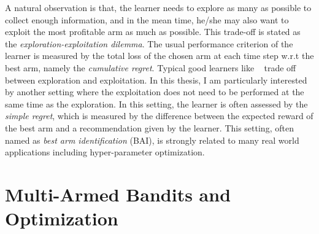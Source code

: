 A natural observation is that, the learner needs to explore as many as possible to collect enough information, and in the mean time, he/she may also want to exploit the most profitable arm as much as possible. This trade-off is stated as the \textit{exploration-exploitation dilemma}. The usual performance criterion of the learner is measured by the total loss of the chosen arm at each time step w.r.t the best arm, namely the \emph{cumulative regret}. Typical good learners like \UCB~\citep{auer2002ucb} trade off between exploration and exploitation. In this thesis, I am particularly interested by another setting  where the exploitation does not need to be performed at the same time as the exploration. In this setting, the learner is often assessed by the \emph{simple regret}, which is measured by the difference between the expected reward of the best arm and a recommendation given by the learner. This setting, often named as \emph{best arm identification} (BAI), is strongly related to many real world applications including hyper-parameter optimization.



\section{Multi-Armed Bandits and Optimization}\label{sec:intro.mab}
    
